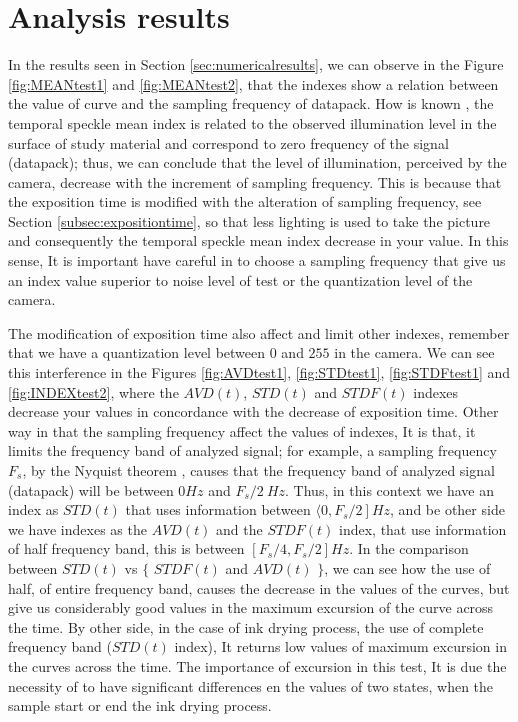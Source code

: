 \documentclass[review]{elsarticle}
\begin{document}
\section{Analysis results} 
\label{sec:analysisresults}


In the results seen in Section \ref{sec:numericalresults},
we can observe in the Figure \ref{fig:MEANtest1} and \ref{fig:MEANtest2}, 
that the indexes show a relation between the value of curve and the sampling frequency of datapack. 
How is known \cite{Nothdurft:05}, the temporal speckle mean index is related to 
the observed illumination level in the surface of study material and correspond to zero frequency of the signal (datapack);
thus, we can conclude that the level of illumination, perceived by the camera, 
decrease with the increment of sampling frequency. 
This is because that the exposition time is modified with the alteration of sampling frequency, 
see Section \ref{subsec:expositiontime}, 
so that less lighting is used to take the picture and consequently the 
temporal speckle mean index decrease in  your value.
In this sense, It is important have careful in to choose a sampling frequency
that give us an index value superior to noise level of test or the quantization level of the camera.


The modification of exposition time also affect  and limit other indexes,
remember that we have a quantization level between $0$ and $255$ in the camera. 
We can see this interference in the Figures \ref{fig:AVDtest1}, \ref{fig:STDtest1}, \ref{fig:STDFtest1} and \ref{fig:INDEXtest2}, 
where the $AVD(t)$, $STD(t)$ and $STDF(t)$ indexes decrease your values in concordance with the decrease of exposition time.
Other way in that  the sampling frequency affect the values of indexes,
It is that, it limits the frequency band of analyzed signal; for example,
a sampling frequency $F_s$, by the Nyquist theorem \cite{Nyquist,Shannon}, 
causes that the frequency band of analyzed signal (datapack)  will be between $0 Hz$ and $F_s/2~Hz$.
Thus, in this context we have an index as $STD(t)$ that uses information between $\langle \left. 0, F_s/2 \right ] Hz$, 
and be other side we have indexes as the $AVD(t)$ and the $STDF(t)$ index, that use information of half frequency band, 
this is between $\left [ F_s/4, F_s/2 \right ] Hz$.
In the comparison between $STD(t)$ vs  $\{$ $STDF(t)$ and $AVD(t)$ $\}$, 
we can see how the use of half, of entire frequency band, causes the decrease in the values of the curves, 
but give us considerably good values in the maximum excursion of the curve across the time. By other side,
in the case of ink drying process, the use of complete frequency band ($STD(t)$ index), 
It returns low values of maximum excursion in the curves across the time. 
The importance of excursion in this test,
 It is due the necessity of to have significant differences en the values of two states,
when the sample start or end the ink drying process.
\end{document}
